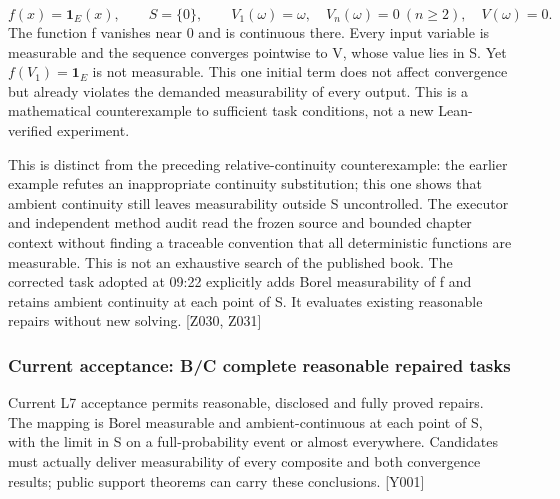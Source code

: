 \[
f(x)=\mathbf{1}_E(x),\qquad S=\{0\},\qquad
V_1(\omega)=\omega,\quad V_n(\omega)=0\ (n\ge2),\quad V(\omega)=0.
\]
The function f vanishes near 0 and is continuous there. Every input variable is measurable and the sequence converges pointwise to V, whose value lies in S. Yet $f(V_1)=\mathbf{1}_E$ is not measurable. This one initial term does not affect convergence but already violates the demanded measurability of every output. This is a mathematical counterexample to sufficient task conditions, not a new Lean-verified experiment.

This is distinct from the preceding relative-continuity counterexample: the earlier example refutes an inappropriate continuity substitution; this one shows that ambient continuity still leaves measurability outside S uncontrolled. The executor and independent method audit read the frozen source and bounded chapter context without finding a traceable convention that all deterministic functions are measurable. This is not an exhaustive search of the published book. The corrected task adopted at 09:22 explicitly adds Borel measurability of f and retains ambient continuity at each point of S. It evaluates existing reasonable repairs without new solving. [Z030, Z031]

\subsubsection[Current acceptance: B/C complete reasonable repaired tasks]{\texorpdfstring{\protect\hypertarget{g16-2}{}Current acceptance: B/C complete reasonable repaired tasks}{Current acceptance: B/C complete reasonable repaired tasks}}
Current L7 acceptance permits reasonable, disclosed and fully proved repairs. The mapping is Borel measurable and ambient-continuous at each point of S, with the limit in S on a full-probability event or almost everywhere. Candidates must actually deliver measurability of every composite and both convergence results; public support theorems can carry these conclusions. [Y001]

